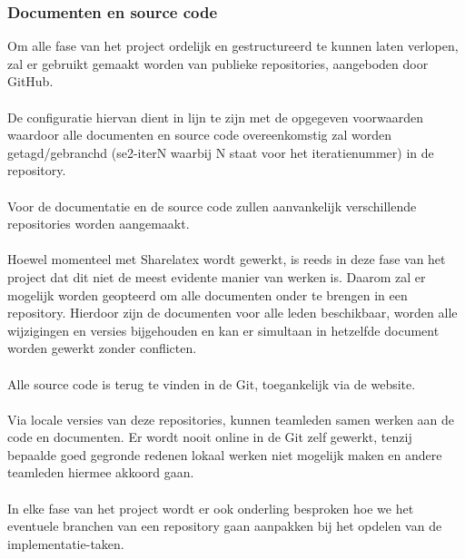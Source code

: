\subsubsection{Documenten en source code}
Om alle fase van het project ordelijk en gestructureerd te kunnen laten verlopen, zal er gebruikt gemaakt worden van publieke repositories, aangeboden door GitHub.
\\
\\
De configuratie hiervan dient in lijn te zijn met de opgegeven voorwaarden waardoor alle documenten en source code overeenkomstig zal worden getagd/gebranchd (se2-iterN waarbij N staat voor het iteratienummer) in de repository.
\\
\\
Voor de documentatie en de source code zullen aanvankelijk verschillende repositories worden aangemaakt. 
\\
\\
Hoewel momenteel met Sharelatex\cite{ShareLateX} wordt gewerkt, is reeds in deze fase van het project dat dit niet de meest evidente manier van werken is. Daarom zal er mogelijk worden geopteerd om alle documenten onder te brengen in een repository. Hierdoor zijn de documenten voor alle leden beschikbaar, worden alle wijzigingen en versies bijgehouden en kan er simultaan in hetzelfde document worden gewerkt zonder conflicten.
\\
\\
Alle source code is terug te vinden in de Git, toegankelijk via de website.
\\
\\
Via locale versies van deze repositories, kunnen teamleden samen werken aan de code en documenten. Er wordt nooit online in de Git zelf gewerkt, tenzij bepaalde goed gegronde redenen lokaal werken niet mogelijk maken en andere teamleden hiermee akkoord gaan.
\\
\\
In elke fase van het project wordt er ook onderling besproken hoe we het eventuele branchen van een repository gaan aanpakken bij het opdelen van de implementatie-taken.

